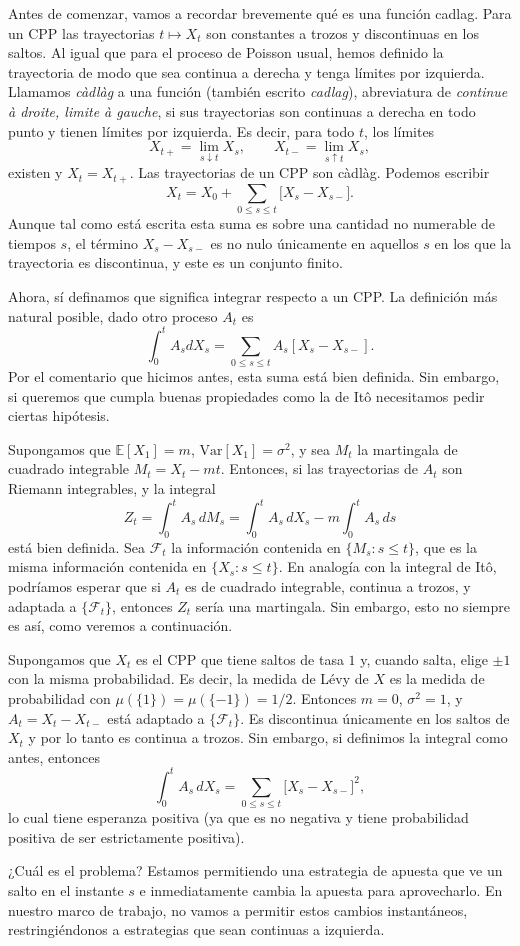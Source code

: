 \documentclass[
marginals=nomargin
]{kaohandt}
\begin{document}
	Antes de comenzar, vamos a recordar brevemente qué es una función cadlag. Para un CPP las trayectorias $t \mapsto X_t$ son constantes a trozos y discontinuas en los saltos. Al igual que para el proceso de Poisson usual, hemos definido la trayectoria de modo que sea continua a derecha y tenga límites por izquierda. Llamamos \emph{càdlàg} a una función (también escrito \emph{cadlag}), abreviatura de \emph{continue à droite, limite à gauche}, si sus trayectorias son continuas a derecha en todo punto y tienen límites por izquierda. Es decir, para todo $t$, los límites
	\[
	X_{t+} = \lim_{s \downarrow t} X_s, \qquad X_{t-} = \lim_{s \uparrow t} X_s,
	\]
	existen y $X_t = X_{t+}$. Las trayectorias de un CPP son càdlàg. Podemos escribir
	\[
	X_t = X_0 + \sum_{0 \leq s \leq t} \big[X_s - X_{s-}\big].
	\]
	Aunque tal como está escrita esta suma es sobre una cantidad no numerable de tiempos $s$, el término $X_s - X_{s-}$ es no nulo únicamente en aquellos $s$ en los que la trayectoria es discontinua, y este es un conjunto finito.
	
	Ahora, sí definamos que significa integrar respecto a un CPP. La definición más natural posible, dado otro proceso $A_t$ es 
	$$\int_{0}^{t} A_s dX_s = \sum_{0\leq s\leq t} A_s [X_s - X_{s-}].$$ 
	Por el comentario que hicimos antes, esta suma está bien definida. Sin embargo, si queremos que cumpla buenas propiedades como la de Itô necesitamos pedir ciertas hipótesis.		
	
	Supongamos que $\mathbb{E}[X_1] = m$, $\mathrm{Var}[X_1] = \sigma^2$, y sea $M_t$ la martingala de cuadrado integrable $M_t = X_t - mt$. Entonces, si las trayectorias de $A_t$ son Riemann integrables, y la integral
	\[
	Z_t = \int_0^t A_s\, dM_s = \int_0^t A_s\, dX_s - m\int_0^t A_s\, ds
	\]
	está bien definida. Sea $\mathcal{F}_t$ la información contenida en $\{M_s : s \leq t\}$, que es la misma información contenida en $\{X_s : s \leq t\}$. En analogía con la integral de Itô, podríamos esperar que si $A_t$ es de cuadrado integrable, continua a trozos, y adaptada a $\{\mathcal{F}_t\}$, entonces $Z_t$ sería una martingala. Sin embargo, esto no siempre es así, como veremos a continuación.

	\begin{example}
		Supongamos que $X_t$ es el CPP que tiene saltos de tasa $1$ y, cuando salta, elige $\pm 1$ con la misma probabilidad. Es decir, la medida de Lévy de $X$ es la medida de probabilidad con $\mu(\{1\}) = \mu(\{-1\}) = 1/2$. Entonces $m=0$, $\sigma^2=1$, y $A_t = X_t - X_{t-}$ está adaptado a $\{\mathcal{F}_t\}$. Es discontinua únicamente en los saltos de $X_t$ y por lo tanto es continua a trozos. Sin embargo, si definimos la integral como antes, entonces
		\[
		\int_0^t A_s\, dX_s = \sum_{0 \leq s \leq t} \big[X_s - X_{s-}\big]^2,
		\]
		lo cual tiene esperanza positiva (ya que es no negativa y tiene probabilidad positiva de ser estrictamente positiva).
		
		¿Cuál es el problema? Estamos permitiendo una estrategia de apuesta que ve un salto en el instante $s$ e inmediatamente cambia la apuesta para aprovecharlo. En nuestro marco de trabajo, no vamos a permitir estos cambios instantáneos, restringiéndonos a estrategias que sean continuas a izquierda.	
	\end{example}
	
\end{document}
